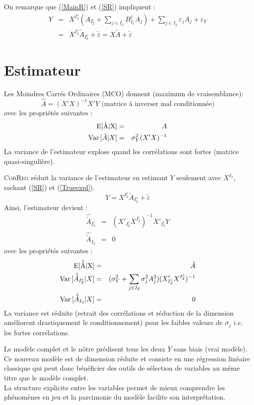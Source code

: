 \documentclass[12pt]{article}
\begin{document}
On remarque que (\ref{MainR}) et (\ref{SR}) impliquent :
\begin{eqnarray}
	Y&=&X^{I_2^c} (A_{I_2^c}+ \sum_{j \in I_2}B^{j}_{I_1}A_{j})+  \sum_{j \in I_2}\varepsilon_{j}A_{j}+\varepsilon_Y \\
					&=& X^{I_2^c}\tilde{A}_{I_2^c}+ \tilde{\varepsilon}=X\tilde{A}+ \tilde{\varepsilon}\label{Trueexpl} 			
\end{eqnarray}
\section{Estimateur}
	Les Moindres Carrés Ordinaires (MCO) donnent (maximum de vraisemblance): 
		\begin{equation}
			\hat A = (X'X)^{-1}X'Y \textrm{ (matrice à inverser mal conditionnée)}
		\end{equation}
		avec les propriétés suivantes :
		\begin{eqnarray}
			\rm{E}[\hat{A}|X]&=&A \\
			{\rm Var}\,[\hat{A}|X]&=& \sigma_Y^2(X'X)^{-1}
		\end{eqnarray}				
		La variance de l'estimateur explose quand les corrélations sont fortes (matrice quasi-singulière).
 			
		\textsc{CorReg} réduit la variance de l'estimateur en estimant $Y$ seulement avec $X^{I_1}$, sachant (\ref{SR}) et (\ref{Trueexpl}).
			\begin{equation}
				Y= X^{I_2^c}\tilde{A}_{I_2^c}+ \tilde{\varepsilon}\label{explicatif}
			\end{equation}							
		Ainsi, l'estimateur devient : 
		\begin{eqnarray}
			\hat{\tilde{A}}_{I_2^c} &=& (X'_{I_2^c} X^{I_2^c})^{-1}X'_{I_2^c}Y \\
			\hat{\tilde{A}}_{I_2} &=& 0
		\end{eqnarray}
		avec les propriétés suivantes :
		\begin{eqnarray}
			\rm{E}[\hat{\tilde{A}}|X]&=&\tilde{A} \\
			{\rm Var}\,[\hat{\tilde{A}}_{I_2^c}|X]&=& (\sigma^2_Y+\sum_{j \in I_2}\sigma^2_{j}A_{j}^2 )(X'_{I_2^c} X^{I_2^c})^{-1} \\
			{\rm Var}\,[\hat{\tilde{A}}_{I_2}|X]&=& 0 
		\end{eqnarray}
		La variance est réduite (retrait des corrélations et réduction de la dimension améliorent drastiquement le conditionnement) pour les faibles valeurs de $\sigma_j$ $i.e.$ les fortes corrélations.					
		
		Le modèle complet et le nôtre prédisent tous les deux $Y$ sans biais (vrai modèle)\cite{saporta2006probabilites}.
	\\	
	Ce nouveau modèle est de dimension réduite et consiste en une régression linéaire classique qui peut donc bénéficier des outils de sélection de variables au même titre que le modèle complet.			
		 \\		
		 La structure explicite entre les variables permet de mieux comprendre les phénomènes en jeu et la parcimonie du modèle facilite son interprétation.		
\end{document}
